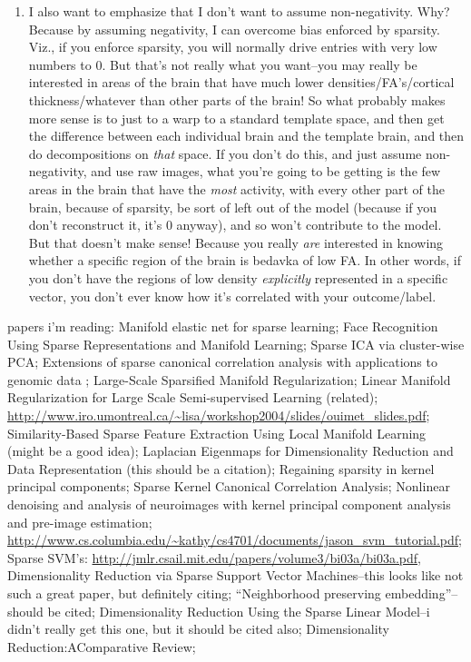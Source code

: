 \documentclass{nih}
\begin{document}
\begin{enumerate}
\item I also want to emphasize that I don't want to assume non-negativity.  Why?  Because by assuming negativity, I can overcome bias enforced by sparsity.  Viz., if you enforce sparsity, you will normally drive entries with very low numbers to 0.  But that's not really what you want--you may really be interested in areas of the brain that have much lower densities/FA's/cortical thickness/whatever than other parts of the brain!  So what probably makes more sense is to just to a warp to a standard template space, and then get the difference between each individual brain and the template brain, and then do decompositions on \textit{that} space.  If you don't do this, and just assume non-negativity, and use raw images, what you're going to be getting is the few areas in the brain that have the \textit{most} activity, with every other part of the brain, because of sparsity, be sort of left out of the model (because if you don't reconstruct it, it's 0 anyway), and so won't contribute to the model.  But that doesn't make sense!  Because you really \textit{are} interested in knowing whether a specific region of the brain is bedavka of low FA.  In other words, if you don't have the regions of low density \textit{explicitly} represented in a specific vector, you don't ever know how it's correlated with your outcome/label.
\end{enumerate}
papers i'm reading: Manifold elastic net for sparse learning; Face Recognition Using Sparse Representations and 
Manifold Learning; Sparse ICA via cluster-wise PCA; Extensions of sparse canonical correlation analysis with applications to genomic data \cite{witten_extensions_2009}; Large-Scale Sparsified Manifold Regularization; Linear Manifold Regularization for
Large Scale Semi-supervised Learning (related); \url{http://www.iro.umontreal.ca/~lisa/workshop2004/slides/ouimet_slides.pdf}; Similarity-Based Sparse Feature Extraction Using Local Manifold Learning (might be a good idea); Laplacian Eigenmaps for Dimensionality Reduction and Data Representation (this should be a citation); Regaining sparsity in kernel principal components; Sparse Kernel Canonical Correlation Analysis; Nonlinear denoising and analysis of neuroimages with kernel principal component analysis and pre-image estimation; \url{http://www.cs.columbia.edu/~kathy/cs4701/documents/jason_svm_tutorial.pdf}; Sparse SVM's: \url{http://jmlr.csail.mit.edu/papers/volume3/bi03a/bi03a.pdf}, Dimensionality Reduction via Sparse Support Vector Machines--this looks like not such a great paper, but definitely citing; ``Neighborhood preserving embedding''--should be cited; Dimensionality Reduction Using the Sparse Linear Model--i didn't really get this one, but it should be cited also; Dimensionality Reduction:AComparative Review; 
\end{document}
